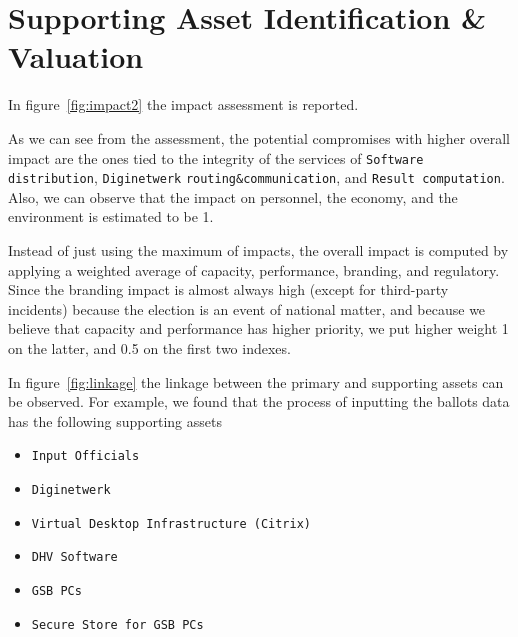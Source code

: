 \section*{Supporting Asset Identification \& Valuation}

In figure~\ref{fig:impact2} the impact assessment is reported.

As we can see from the assessment, the potential compromises with higher overall impact are the ones tied to the integrity of the services of \texttt{Software distribution}, \texttt{Diginetwerk} \texttt{routing\&communication}, and \texttt{Result computation}. Also, we can observe that the impact on personnel, the economy, and the environment is estimated to be 1. 

Instead of just using the maximum of impacts, the overall impact is computed by applying a weighted average of capacity, performance, branding, and regulatory. Since the branding impact is almost always high (except for third-party incidents) because the election is an event of national matter, and because we believe that capacity and performance has higher priority, we put higher weight 1 on the latter, and 0.5 on the first two indexes.

In figure~\ref{fig:linkage} the linkage between the primary and supporting assets can be observed. For example, we found that the process of inputting the ballots data has the following supporting assets

\begin{itemize}
    \item \texttt{Input Officials}
    \item \texttt{Diginetwerk}
    \item \texttt{Virtual Desktop Infrastructure (Citrix)}
    \item \texttt{DHV Software}
    \item \texttt{GSB PCs}
    \item \texttt{Secure Store for GSB PCs}
\end{itemize}


